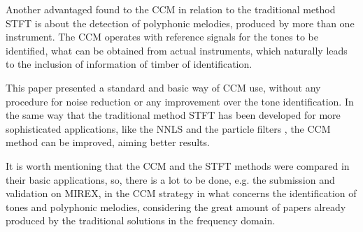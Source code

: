 \documentclass{article}
\begin{document}
	Another advantaged found to the CCM in relation to the traditional method STFT is about the detection of polyphonic melodies, produced by more than one instrument. The CCM operates with reference signals for the tones to be identified, what can be obtained from actual instruments, which naturally leads to the inclusion of information of timber of identification. 

	This paper presented a standard and basic way of CCM use, without any procedure for noise reduction or any improvement over the tone identification. In the same way that the traditional method STFT has been developed for more sophisticated applications, like the NNLS \cite{mauch2010approximate} and the particle filters \cite{jo2010melody}, the CCM method can be improved, aiming better results.
	
	It is worth mentioning that the CCM and the STFT methods were compared in their basic applications, so, there is a lot to be done, e.g. the submission and validation on MIREX, in the CCM strategy in what concerns the identification of tones and polyphonic melodies, considering the great amount of papers already produced by the traditional solutions in the frequency domain.




%
%
%
%
\end{document}
